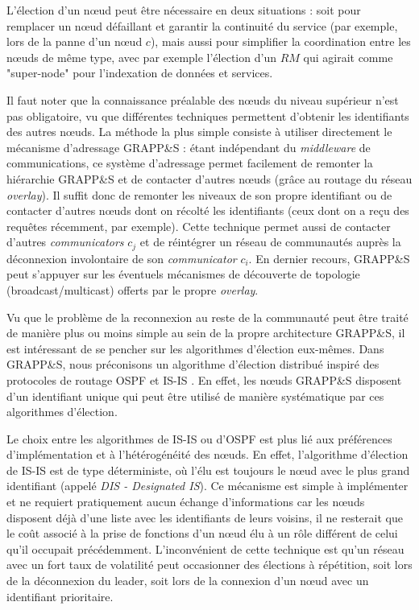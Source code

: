 L'élection d'un n{\oe}ud peut être nécessaire en deux situations : soit pour remplacer un n{\oe}ud défaillant et garantir la continuité du service (par exemple, lors de la panne d'un n{\oe}ud $c$), mais aussi pour simplifier la coordination entre les n{\oe}uds de même type, avec par exemple l'élection d'un $RM$ qui agirait comme "super-node" pour l'indexation de données et services. 

Il faut noter que la connaissance préalable des n{\oe}uds du niveau supérieur n'est pas obligatoire, vu que différentes techniques permettent d'obtenir les identifiants des autres n{\oe}uds. La méthode la plus simple consiste à utiliser directement le mécanisme d'adressage GRAPP\&S : étant indépendant du \textit{middleware} de communications, ce système d'adressage permet facilement de remonter la hiérarchie GRAPP\&S et de contacter d'autres n{\oe}uds (grâce au routage du réseau \textit{overlay}). Il suffit donc de remonter les niveaux de son propre identifiant ou de contacter d'autres n{\oe}uds dont on récolté les identifiants (ceux dont on a reçu des requêtes récemment, par exemple). Cette technique permet aussi de contacter d'autres \textit{communicators} $c_j$ et de réintégrer un réseau de communautés auprès la déconnexion involontaire de son \textit{communicator} $c_i$. En dernier recours, GRAPP\&S peut s'appuyer sur les éventuels mécanismes de découverte de topologie (broadcast/multicast) offerts par le propre \textit{overlay}.

Vu que le problème de la reconnexion au reste de la communauté peut être traité de manière plus ou moins simple au sein de la propre architecture GRAPP\&S, il est intéressant de se pencher sur les algorithmes d'élection eux-mêmes. Dans GRAPP\&S, nous préconisons un algorithme d'élection distribué inspiré des protocoles de routage OSPF et IS-IS \cite{rfc1142,rfc2328,ISISxOSPF}. En effet, les n{\oe}uds GRAPP\&S disposent d'un identifiant unique qui peut être utilisé de manière systématique par ces algorithmes d'élection. 

Le choix entre les algorithmes de IS-IS ou d'OSPF est plus lié aux préférences d'implémentation et à l'hétérogénéité des n{\oe}uds. En effet, l'algorithme d'élection de IS-IS est de type déterministe, où l'élu est toujours le n{\oe}ud avec le plus grand identifiant (appelé \textit{DIS - Designated IS}). Ce mécanisme est simple à implémenter et ne requiert pratiquement aucun échange d'informations car les n{\oe}uds disposent déjà d'une liste avec les identifiants de leurs voisins, il ne resterait que le coût associé à la prise de fonctions d'un n{\oe}ud élu à un rôle différent de celui qu'il occupait précédemment. L'inconvénient de cette technique est qu'un réseau avec un fort taux de volatilité peut occasionner des élections à répétition, soit lors de la déconnexion du leader, soit lors de la connexion d'un n{\oe}ud avec un identifiant prioritaire.

